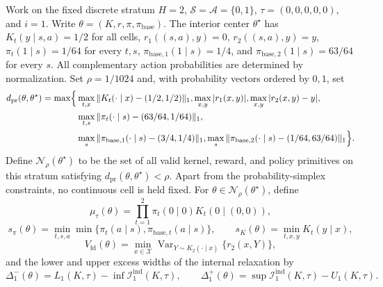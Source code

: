 Work on the fixed discrete stratum \(H=2\), \(\mathcal S=\mathcal A=\{0,1\}\), \(\tau=(0,0,0,0,0)\), and \(i=1\).  Write \(\theta=(K,r,\pi,\pi_{\mathrm{base}})\).  The interior center \(\theta^\star\) has \(K_t(y\mid s,a)=1/2\) for all cells, \(r_1((s,a),y)=0\), \(r_2((s,a),y)=y\), \(\pi_t(1\mid s)=1/64\) for every \(t,s\), \(\pi_{\mathrm{base},1}(1\mid s)=1/4\), and \(\pi_{\mathrm{base},2}(1\mid s)=63/64\) for every \(s\).  All complementary action probabilities are determined by normalization.  Set \(\rho=1/1024\) and, with probability vectors ordered by \(0,1\), set
\[
\begin{aligned}
d_{\mathrm{pr}}(\theta,\theta^\star)=\max\Bigl\{
&\max_{t,x}\|K_t(\cdot\mid x)-(1/2,1/2)\|_1,
 \max_{x,y}|r_1(x,y)|,
 \max_{x,y}|r_2(x,y)-y|,\\
&\max_{t,s}\|\pi_t(\cdot\mid s)-(63/64,1/64)\|_1,\\
&\max_s\|\pi_{\mathrm{base},1}(\cdot\mid s)-(3/4,1/4)\|_1,
 \max_s\|\pi_{\mathrm{base},2}(\cdot\mid s)-(1/64,63/64)\|_1
\Bigr\}.
\end{aligned}
\]
Define \(\mathcal N_\rho(\theta^\star)\) to be the set of all valid kernel, reward, and policy primitives on this stratum satisfying \(d_{\mathrm{pr}}(\theta,\theta^\star)<\rho\).  Apart from the probability-simplex constraints, no continuous cell is held fixed.  For \(\theta\in\mathcal N_\rho(\theta^\star)\), define
\[
 \mu_\tau(\theta)=\prod_{t=1}^2\pi_t(0\mid0)K_t(0\mid(0,0)),
\]
\[
 s_\pi(\theta)=\min_{t,s,a}\min\{\pi_t(a\mid s),\pi_{\mathrm{base},t}(a\mid s)\},
 \qquad
 s_K(\theta)=\min_{t,x,y}K_t(y\mid x),
\]
\[
 V_{\mathrm{fd}}(\theta)=\min_{x\in\mathcal X}
 \operatorname{Var}_{Y\sim K_2(\cdot\mid x)}\{r_2(x,Y)\},
\]
and the lower and upper excess widths of the internal relaxation by
\[
 \Delta_1^-(\theta)=L_1(K,\tau)-\inf\mathcal I_1^{\mathrm{ind}}(K,\tau),
 \qquad
 \Delta_1^+(\theta)=\sup\mathcal I_1^{\mathrm{ind}}(K,\tau)-U_1(K,\tau).
\]